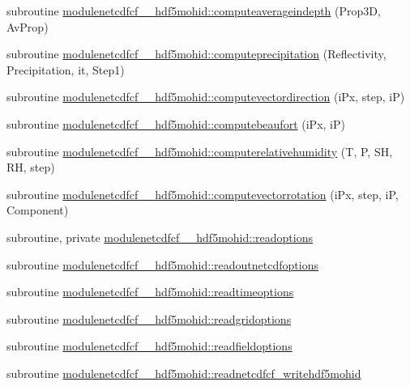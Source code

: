 \begin{DoxyCompactItemize}
\item 
subroutine \mbox{\hyperlink{namespacemodulenetcdfcf__2__hdf5mohid_ad68e046fa00afcf9001262e40ce56492}{modulenetcdfcf\+\_\+\_\+hdf5mohid\+::computeaverageindepth}} (Prop3D, Av\+Prop)
\item 
subroutine \mbox{\hyperlink{namespacemodulenetcdfcf__2__hdf5mohid_acd498610133c943ab2fe7e2cfc7c69e1}{modulenetcdfcf\+\_\+\_\+hdf5mohid\+::computeprecipitation}} (Reflectivity, Precipitation, it, Step1)
\item 
subroutine \mbox{\hyperlink{namespacemodulenetcdfcf__2__hdf5mohid_a035fed19e9c4075ee7babb392fe071e6}{modulenetcdfcf\+\_\+\_\+hdf5mohid\+::computevectordirection}} (i\+Px, step, iP)
\item 
subroutine \mbox{\hyperlink{namespacemodulenetcdfcf__2__hdf5mohid_a342a5907548f35cf4975a0ffd50c9a3c}{modulenetcdfcf\+\_\+\_\+hdf5mohid\+::computebeaufort}} (i\+Px, iP)
\item 
subroutine \mbox{\hyperlink{namespacemodulenetcdfcf__2__hdf5mohid_a7f79a0cd0ca5a26cabb89d21e7a2daf4}{modulenetcdfcf\+\_\+\_\+hdf5mohid\+::computerelativehumidity}} (T, P, SH, RH, step)
\item 
subroutine \mbox{\hyperlink{namespacemodulenetcdfcf__2__hdf5mohid_a849aa8add58ebd9a4fc70960b4af25fa}{modulenetcdfcf\+\_\+\_\+hdf5mohid\+::computevectorrotation}} (i\+Px, step, iP, Component)
\item 
subroutine, private \mbox{\hyperlink{namespacemodulenetcdfcf__2__hdf5mohid_aa120ed50c203e49fe912874719cd402d}{modulenetcdfcf\+\_\+\_\+hdf5mohid\+::readoptions}}
\item 
subroutine \mbox{\hyperlink{namespacemodulenetcdfcf__2__hdf5mohid_ae51ef08c6aac5023d3661f6ec659119a}{modulenetcdfcf\+\_\+\_\+hdf5mohid\+::readoutnetcdfoptions}}
\item 
subroutine \mbox{\hyperlink{namespacemodulenetcdfcf__2__hdf5mohid_ab249ad2d3a887227db840c6a431fe4a4}{modulenetcdfcf\+\_\+\_\+hdf5mohid\+::readtimeoptions}}
\item 
subroutine \mbox{\hyperlink{namespacemodulenetcdfcf__2__hdf5mohid_a7c8cc3d3916c4dc8bd05f9754fbc5421}{modulenetcdfcf\+\_\+\_\+hdf5mohid\+::readgridoptions}}
\item 
subroutine \mbox{\hyperlink{namespacemodulenetcdfcf__2__hdf5mohid_a21d2fbdc24da139bc76ad03220d11dc9}{modulenetcdfcf\+\_\+\_\+hdf5mohid\+::readfieldoptions}}
\item 
subroutine \mbox{\hyperlink{namespacemodulenetcdfcf__2__hdf5mohid_a3998ea5c718e38c4e1c63dcb93c8fdac}{modulenetcdfcf\+\_\+\_\+hdf5mohid\+::readnetcdfcf\+\_\+writehdf5mohid}}

\end{DoxyCompactItemize}

